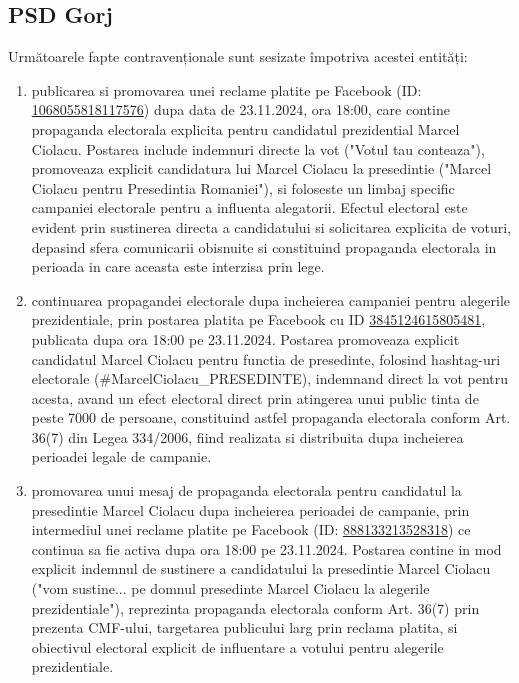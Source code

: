 \documentclass[a4paper,12pt]{article}
\begin{document}
\subsection{PSD Gorj}
Următoarele fapte contravenționale sunt sesizate împotriva acestei entități:

\begin{enumerate}[leftmargin=*, label=\arabic*.)]
    \item publicarea si promovarea unei reclame platite pe Facebook (ID: \href{https://www.facebook.com/ads/library/?id=1068055818117576}{1068055818117576}) dupa data de 23.11.2024, ora 18:00, care contine propaganda electorala explicita pentru candidatul prezidential Marcel Ciolacu. Postarea include indemnuri directe la vot ("Votul tau conteaza"), promoveaza explicit candidatura lui Marcel Ciolacu la presedintie ("Marcel Ciolacu pentru Presedintia Romaniei"), si foloseste un limbaj specific campaniei electorale pentru a influenta alegatorii. Efectul electoral este evident prin sustinerea directa a candidatului si solicitarea explicita de voturi, depasind sfera comunicarii obisnuite si constituind propaganda electorala in perioada in care aceasta este interzisa prin lege.
    \item continuarea propagandei electorale dupa incheierea campaniei pentru alegerile prezidentiale, prin postarea platita pe Facebook cu ID \href{https://www.facebook.com/ads/library/?id=3845124615805481}{3845124615805481}, publicata dupa ora 18:00 pe 23.11.2024. Postarea promoveaza explicit candidatul Marcel Ciolacu pentru functia de presedinte, folosind hashtag-uri electorale (\#MarcelCiolacu\_PRESEDINTE), indemnand direct la vot pentru acesta, avand un efect electoral direct prin atingerea unui public tinta de peste 7000 de persoane, constituind astfel propaganda electorala conform Art. 36(7) din Legea 334/2006, fiind realizata si distribuita dupa incheierea perioadei legale de campanie.
    \item promovarea unui mesaj de propaganda electorala pentru candidatul la presedintie Marcel Ciolacu dupa incheierea perioadei de campanie, prin intermediul unei reclame platite pe Facebook (ID: \href{https://www.facebook.com/ads/library/?id=888133213528318}{888133213528318}) ce continua sa fie activa dupa ora 18:00 pe 23.11.2024. Postarea contine in mod explicit indemnul de sustinere a candidatului la presedintie Marcel Ciolacu ("vom sustine... pe domnul presedinte Marcel Ciolacu la alegerile prezidentiale"), reprezinta propaganda electorala conform Art. 36(7) prin prezenta CMF-ului, targetarea publicului larg prin reclama platita, si obiectivul electoral explicit de influentare a votului pentru alegerile prezidentiale.
\end{enumerate}
\end{document}
